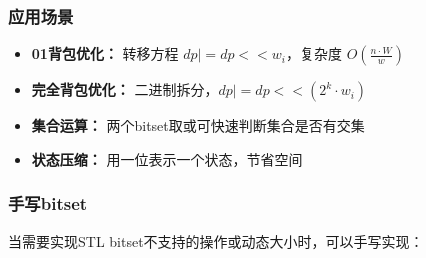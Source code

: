 \documentclass[a4paper, fontset=none]{ctexart}
\begin{document}
\subsubsection{应用场景}
\begin{itemize}
\item \textbf{01背包优化：} 转移方程 $dp |= dp << w_i$，复杂度 $O(\frac{n \cdot W}{w})$
\item \textbf{完全背包优化：} 二进制拆分，$dp |= dp << (2^k \cdot w_i)$
\item \textbf{集合运算：} 两个bitset取或可快速判断集合是否有交集
\item \textbf{状态压缩：} 用一位表示一个状态，节省空间
\end{itemize}

\subsubsection{手写bitset}
当需要实现STL bitset不支持的操作或动态大小时，可以手写实现：
\end{document}
